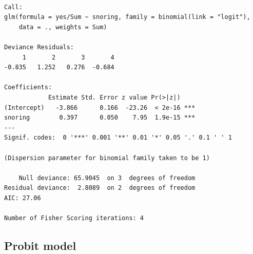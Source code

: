 \documentclass[]{book}
\newenvironment{Shaded}{\begin{snugshade}}{\end{snugshade}}
\newcommand{\DataTypeTok}[1]{\textcolor[rgb]{0.13,0.29,0.53}{#1}}
\newcommand{\DecValTok}[1]{\textcolor[rgb]{0.00,0.00,0.81}{#1}}
\newcommand{\KeywordTok}[1]{\textcolor[rgb]{0.13,0.29,0.53}{\textbf{#1}}}
\newcommand{\NormalTok}[1]{#1}
\newcommand{\OperatorTok}[1]{\textcolor[rgb]{0.81,0.36,0.00}{\textbf{#1}}}
\newcommand{\StringTok}[1]{\textcolor[rgb]{0.31,0.60,0.02}{#1}}
\begin{document}
\begin{verbatim}

Call:
glm(formula = yes/Sum ~ snoring, family = binomial(link = "logit"), 
    data = ., weights = Sum)

Deviance Residuals: 
     1       2       3       4  
-0.835   1.252   0.276  -0.684  

Coefficients:
            Estimate Std. Error z value Pr(>|z|)    
(Intercept)   -3.866      0.166  -23.26  < 2e-16 ***
snoring        0.397      0.050    7.95  1.9e-15 ***
---
Signif. codes:  0 '***' 0.001 '**' 0.01 '*' 0.05 '.' 0.1 ' ' 1

(Dispersion parameter for binomial family taken to be 1)

    Null deviance: 65.9045  on 3  degrees of freedom
Residual deviance:  2.8089  on 2  degrees of freedom
AIC: 27.06

Number of Fisher Scoring iterations: 4
\end{verbatim}

\begin{Shaded}
\end{Shaded}

\hypertarget{probit-model}{%
\subsection{Probit model}\label{probit-model}}

\begin{Shaded}
\end{Shaded}
\end{document}
